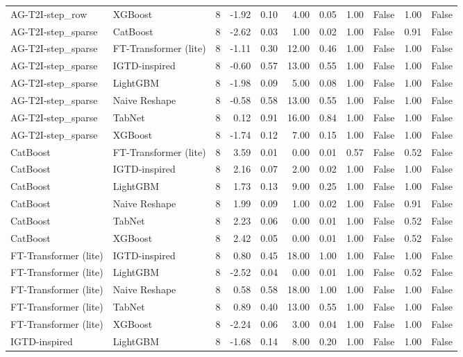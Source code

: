 \begin{tabular}{llrrrrrrlrl}
AG-T2I-step_row & XGBoost & 8 & -1.92 & 0.10 & 4.00 & 0.05 & 1.00 & False & 1.00 & False \\
AG-T2I-step_sparse & CatBoost & 8 & -2.62 & 0.03 & 1.00 & 0.02 & 1.00 & False & 0.91 & False \\
AG-T2I-step_sparse & FT-Transformer (lite) & 8 & -1.11 & 0.30 & 12.00 & 0.46 & 1.00 & False & 1.00 & False \\
AG-T2I-step_sparse & IGTD-inspired & 8 & -0.60 & 0.57 & 13.00 & 0.55 & 1.00 & False & 1.00 & False \\
AG-T2I-step_sparse & LightGBM & 8 & -1.98 & 0.09 & 5.00 & 0.08 & 1.00 & False & 1.00 & False \\
AG-T2I-step_sparse & Naive Reshape & 8 & -0.58 & 0.58 & 13.00 & 0.55 & 1.00 & False & 1.00 & False \\
AG-T2I-step_sparse & TabNet & 8 & 0.12 & 0.91 & 16.00 & 0.84 & 1.00 & False & 1.00 & False \\
AG-T2I-step_sparse & XGBoost & 8 & -1.74 & 0.12 & 7.00 & 0.15 & 1.00 & False & 1.00 & False \\
CatBoost & FT-Transformer (lite) & 8 & 3.59 & 0.01 & 0.00 & 0.01 & 0.57 & False & 0.52 & False \\
CatBoost & IGTD-inspired & 8 & 2.16 & 0.07 & 2.00 & 0.02 & 1.00 & False & 1.00 & False \\
CatBoost & LightGBM & 8 & 1.73 & 0.13 & 9.00 & 0.25 & 1.00 & False & 1.00 & False \\
CatBoost & Naive Reshape & 8 & 1.99 & 0.09 & 1.00 & 0.02 & 1.00 & False & 0.91 & False \\
CatBoost & TabNet & 8 & 2.23 & 0.06 & 0.00 & 0.01 & 1.00 & False & 0.52 & False \\
CatBoost & XGBoost & 8 & 2.42 & 0.05 & 0.00 & 0.01 & 1.00 & False & 0.52 & False \\
FT-Transformer (lite) & IGTD-inspired & 8 & 0.80 & 0.45 & 18.00 & 1.00 & 1.00 & False & 1.00 & False \\
FT-Transformer (lite) & LightGBM & 8 & -2.52 & 0.04 & 0.00 & 0.01 & 1.00 & False & 0.52 & False \\
FT-Transformer (lite) & Naive Reshape & 8 & 0.58 & 0.58 & 18.00 & 1.00 & 1.00 & False & 1.00 & False \\
FT-Transformer (lite) & TabNet & 8 & 0.89 & 0.40 & 13.00 & 0.55 & 1.00 & False & 1.00 & False \\
FT-Transformer (lite) & XGBoost & 8 & -2.24 & 0.06 & 3.00 & 0.04 & 1.00 & False & 1.00 & False \\
IGTD-inspired & LightGBM & 8 & -1.68 & 0.14 & 8.00 & 0.20 & 1.00 & False & 1.00 & False \\

\end{tabular}
